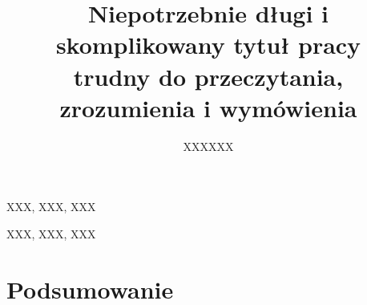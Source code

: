 \documentclass{eiti/eiti-mgr}
\begin{document}
\title{Niepotrzebnie długi i skomplikowany tytuł pracy \\ trudny do przeczytania, zrozumienia i wymówienia}
\author{XXXXXX}
\date{\the\year}
\maketitle

\streszczenie \lipsum[1-3]
\slowakluczowe XXX, XXX, XXX
\newpage

\abstract \kant[1-3]
\keywords XXX, XXX, XXX
\newpage

\makeauthorship
\newpage

\thispagestyle{plain}
\tableofcontents
\newpage


\section{Podsumowanie}   %
\lipsum[5-8]

\newpage



\newpage
\listoffigures %
\vspace{5cm}   %
\listoftables  %
\end{document}
